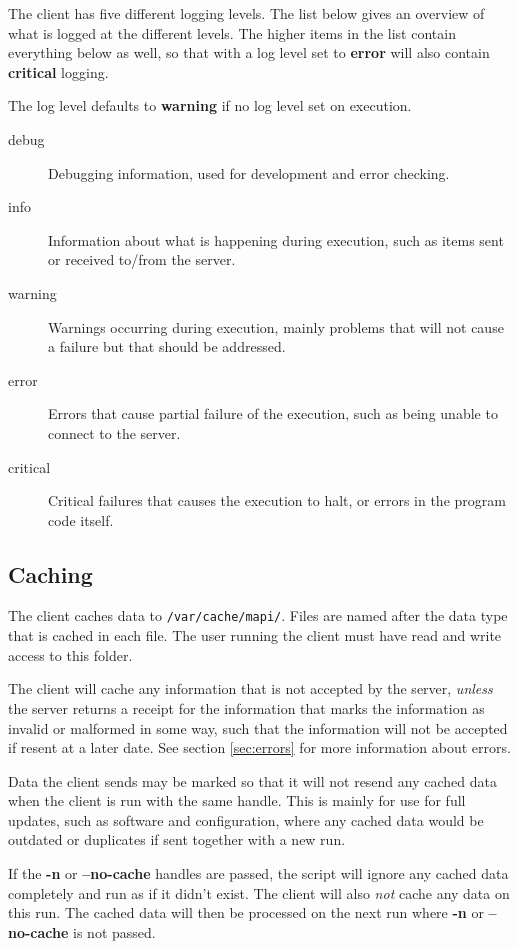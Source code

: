 The client has five different logging levels. The list below gives an overview
of what is logged at the different levels. The higher items in the list contain
everything below as well, so that with a log level set to \textbf{error} will
also contain \textbf{critical} logging.

The log level defaults to \textbf{warning} if no log level set on execution.

\begin{description}
    \item[debug]    Debugging information, used for development and error
    checking.
    \item[info] Information about what is happening during execution, such as
    items sent or received to/from the server.
    \item[warning]  Warnings occurring during execution, mainly problems that
    will not cause a failure but that should be addressed.
    \item[error]    Errors that cause partial failure of the execution, such as
    being unable to connect to the server.
    \item[critical] Critical failures that causes the execution to halt, or
    errors in the program code itself.
\end{description}

\subsection{Caching}
\label{sec:caching}
The client caches data to \texttt{/var/cache/mapi/}. Files are named after the
data type that is cached in each file. The user running the client must have
read and write access to this folder. 

The client will cache any information that is not accepted by the server, 
\textit{unless} the server returns a receipt for the information that marks the 
information as invalid or malformed in some way, such that the information will 
not be accepted if resent at a later date. See section \ref{sec:errors} for
more information about errors.

Data the client sends may be marked so that it will not resend any cached data
when the client is run with the same handle. This is mainly for use for full
updates, such as software and configuration, where any cached data would be
outdated or duplicates if sent together with a new run.

If the \textbf{-n} or \textbf{--no-cache} handles are passed, the script will
ignore any cached data completely and run as if it didn't exist. The client
will also \textit{not} cache any data on this run. The cached data will then be
processed on the next run where \textbf{-n} or \textbf{--no-cache} is not
passed. 
